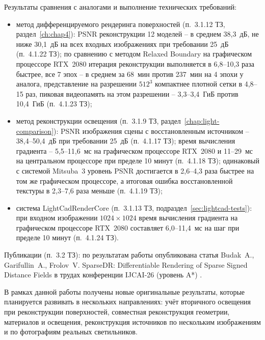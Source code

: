 Результаты сравнения с аналогами и выполнение технических требований:
\begin{itemize}
    \item метод дифференцируемого рендеринга поверхностей (п.~3.1.12 ТЗ, раздел~\ref{ch:chap4}): PSNR реконструкции 12 моделей -- в среднем 38,3~дБ, не ниже 30,1~дБ на всех входных изображениях при требовании 25~дБ (п.~4.1.22 ТЗ); по сравнению с методом Relaxed Boundary на графическом процессоре RTX~2080 итерация реконструкции выполняется в 6,8--10,3 раза быстрее, все 7 эпох -- в среднем за 68~мин против 237~мин на 4 эпохи у аналога, представление на разрешении $512^3$ компактнее плотной сетки в 4,8--15 раз, пиковая видеопамять на этом разрешении -- 3,3--3,4~ГиБ против 10,4~ГиБ (п.~4.1.23 ТЗ);
    \item метод реконструкции освещения (п.~3.1.9 ТЗ, раздел~\ref{chap:light-comparison}): PSNR изображения сцены с восстановленным источником -- 38,4--50,4~дБ при требовании 25~дБ (п.~4.1.17 ТЗ); время вычисления градиента -- 5,5--11,6~мс на графическом процессоре RTX~2080 и 11--29~мс на центральном процессоре при пределе 10 минут (п.~4.1.18 ТЗ); одинаковый с системой Mitsuba~3 уровень PSNR достигается в 2,6--4,3 раза быстрее на том же графическом процессоре, а итоговая ошибка восстановленной текстуры в 2,3--7,6 раза меньше (п.~4.1.19 ТЗ);
    \item система LightCadRenderCore (п.~3.1.13 ТЗ, подраздел~\ref{sec:lightcad-tests}): при входном изображении $1024\times1024$ время вычисления градиента на графическом процессоре RTX~2080 составляет 6,0--11,4~мс на шаг при пределе 10 минут (п.~4.1.24 ТЗ).
\end{itemize}

Публикации (п.~3.2 ТЗ): по результатам работы опубликована статья Budak~A., Garifullin~A., Frolov~V. SparseDR: Differentiable Rendering of Sparse Signed Distance Fields в трудах конференции IJCAI-26 (уровень A*) .

В рамках данной работы получены новые оригинальные результаты, которые планируется развивать в нескольких направлениях: учёт вторичного освещения при реконструкции поверхностей, совместная реконструкция геометрии, материалов и освещения, реконструкция источников по нескольким изображениям и по фотографиям реальных светильников.

\endinput
